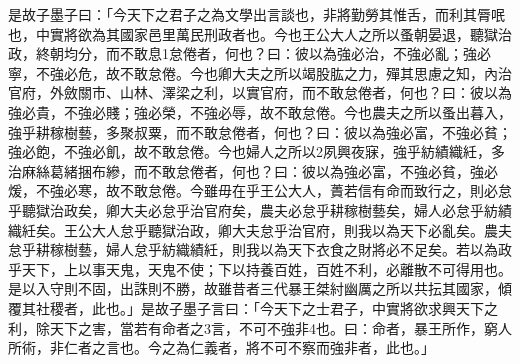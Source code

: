 \begin{pinyinscope}
是故子墨子曰：「今天下之君子之為文學出言談也，非將勤勞其惟舌，而利其脣呡也，中實將欲為其國家邑里萬民刑政者也。今也王公大人之所以蚤朝晏退，聽獄治政，終朝均分，而不敢息1怠倦者，何也？曰：彼以為強必治，不強必亂；強必寧，不強必危，故不敢怠倦。今也卿大夫之所以竭股肱之力，殫其思慮之知，內治官府，外斂關市、山林、澤梁之利，以實官府，而不敢怠倦者，何也？曰：彼以為強必貴，不強必賤；強必榮，不強必辱，故不敢怠倦。今也農夫之所以蚤出暮入，強乎耕稼樹藝，多聚叔粟，而不敢怠倦者，何也？曰：彼以為強必富，不強必貧；強必飽，不強必飢，故不敢怠倦。今也婦人之所以2夙興夜寐，強乎紡績織紝，多治麻絲葛緒捆布縿，而不敢怠倦者，何也？曰：彼以為強必富，不強必貧，強必煖，不強必寒，故不敢怠倦。今雖毋在乎王公大人，蕢若信有命而致行之，則必怠乎聽獄治政矣，卿大夫必怠乎治官府矣，農夫必怠乎耕稼樹藝矣，婦人必怠乎紡績織紝矣。王公大人怠乎聽獄治政，卿大夫怠乎治官府，則我以為天下必亂矣。農夫怠乎耕稼樹藝，婦人怠乎紡織績紝，則我以為天下衣食之財將必不足矣。若以為政乎天下，上以事天鬼，天鬼不使；下以持養百姓，百姓不利，必離散不可得用也。是以入守則不固，出誅則不勝，故雖昔者三代暴王桀紂幽厲之所以共抎其國家，傾覆其社稷者，此也。」是故子墨子言曰：「今天下之士君子，中實將欲求興天下之利，除天下之害，當若有命者之3言，不可不強非4也。曰：命者，暴王所作，窮人所術，非仁者之言也。今之為仁義者，將不可不察而強非者，此也。」


\end{pinyinscope}